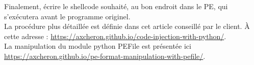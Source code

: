 \documentclass{article}
\begin{document}
Finalement, écrire le shellcode souhaité, au bon endroit dans le PE, 
qui s'exécutera avant le programme originel.\\

La procédure plus détaillée est définie dans cet article conseillé par le client.
À cette adresse : \url{https://axcheron.github.io/code-injection-with-python/}.\\

La manipulation du module python PEFile est présentée ici \url{https://axcheron.github.io/pe-format-manipulation-with-pefile/}.
\end{document}
